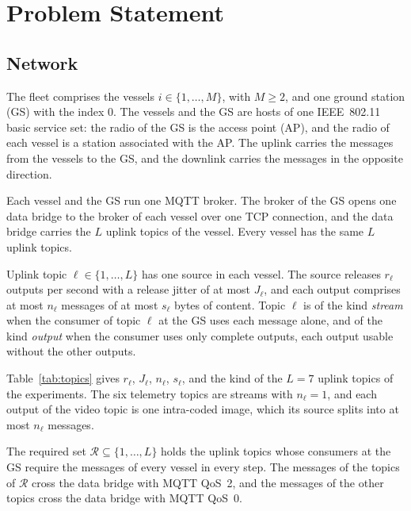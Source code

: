\section{Problem Statement}\label{sec:problem}

\subsection{Network}\label{subsec:network}

\begin{definition}[Fleet]\label{def:fleet}
The fleet comprises the vessels $i \in \{1, \dots, M\}$, with $M \geq 2$, and one ground station (GS) with the index $0$. The vessels and the GS are hosts of one IEEE~802.11 basic service set: the radio of the GS is the access point (AP), and the radio of each vessel is a station associated with the AP. The uplink carries the messages from the vessels to the GS, and the downlink carries the messages in the opposite direction.
\end{definition}

Each vessel and the GS run one MQTT broker. The broker of the GS opens one data bridge to the broker of each vessel over one TCP connection, and the data bridge carries the $L$ uplink topics of the vessel. Every vessel has the same $L$ uplink topics.

\begin{definition}\label{def:topic}
Uplink topic $\ell \in \{1, \dots, L\}$ has one source in each vessel. The source releases $r_\ell$ outputs per second with a release jitter of at most $J_\ell$, and each output comprises at most $n_\ell$ messages of at most $s_\ell$ bytes of content. Topic $\ell$ is of the kind \emph{stream} when the consumer of topic $\ell$ at the GS uses each message alone, and of the kind \emph{output} when the consumer uses only complete outputs, each output usable without the other outputs.
\end{definition}

Table~\ref{tab:topics} gives $r_\ell$, $J_\ell$, $n_\ell$, $s_\ell$, and the kind of the $L = 7$ uplink topics of the experiments. The six telemetry topics are streams with $n_\ell = 1$, and each output of the video topic is one intra-coded image, which its source splits into at most $n_\ell$ messages.

\begin{definition}\label{def:required}
The required set $\mathcal{R} \subseteq \{1, \dots, L\}$ holds the uplink topics whose consumers at the GS require the messages of every vessel in every step. The messages of the topics of $\mathcal{R}$ cross the data bridge with MQTT QoS~2, and the messages of the other topics cross the data bridge with MQTT QoS~0.
\end{definition}

